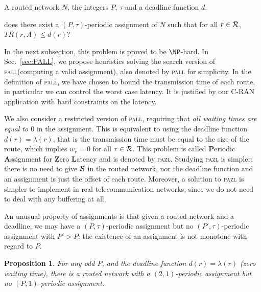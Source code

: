 \documentclass[a4paper,10pt]{article}
\newtheorem{proposition}{Proposition}
\newcommand\pazl{\textsc{pazl}\xspace}
\newcommand\pall{\textsc{pall}\xspace}
\newcommand\pra{\textsc{pra}\xspace}
\begin{document}
     

        A routed network $N$, the integers $P$, $\tau$ and a deadline function $d$.
      
       does there exist a $(P,\tau)$-periodic assignment of $N$ such that for all $r \in {\cal R}$, $TR(r,A) \leq d(r)$?

	  In the next subsection, this problem is proved to be $\NP$-hard. In Sec.~\ref{sec:PALL}, we propose heuristics solving the search version of \pall (computing a valid assignment), also denoted by \pall for simplicity. In the definition of \pall, we have chosen to bound the transmission time of each route, in particular we can control the worst case latency. It is justified by our C-RAN application with hard constraints on the latency. 

     We also consider a restricted version of \pall, requiring that \emph{all waiting times are equal to $0$} in the assignment. This is equivalent to using the deadline function $d(r) = \lambda(r)$, that is the 
     transmission time must be equal to the size of the route, which implies $w_r = 0$ for all $r \in \cal{R}$. This problem is called \textbf{P}eriodic \textbf{A}ssignment for \textbf{Z}ero \textbf{L}atency and is denoted by \pazl. Studying \pazl is simpler: there is no need to give $\cal{B}$ in the routed network, 
     nor the deadline function and an assignment is just the offset of each route. Moreover, a solution to \pazl is simpler to implement in real telecommunication networks, since we do not need to deal with any buffering at all.    
  
      An unusual property of assignments is that given a routed network and a deadline, we may have a $(P,\tau)$-periodic assignment but no $(P',\tau)$-periodic assignment with $P' > P$: the existence of an assignment is not monotone with regard to $P$.

	\begin{proposition} \label{prop:monotonic}
	 For any odd $P$, and the deadline function $d(r) = \lambda(r)$ (zero waiting time), there is a routed network with a $(2,1)$-periodic assignment but no $(P,1)$-periodic assignment.
	\end{proposition}
\end{document}
